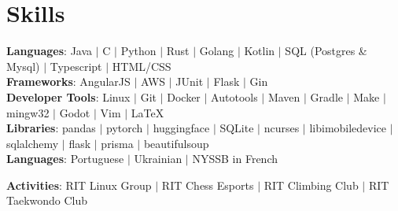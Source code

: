 \documentclass[letterpaper,11pt]{article}
\begin{document}
\section{Skills}
 \begin{itemize}[leftmargin=0.15in, label={}]
    \small{\item{
        \textbf{Languages}{: Java $|$ C $|$ Python $|$ Rust $|$ Golang $|$ Kotlin $|$ SQL (Postgres \& Mysql) $|$ Typescript $|$ HTML/CSS} \\ \vspace{0.5em} 
        \textbf{Frameworks}{: AngularJS $|$ AWS $|$ JUnit $|$ Flask $|$ Gin} \\ \vspace{0.5em} 
        \textbf{Developer Tools}{: Linux $|$ Git $|$ Docker $|$ Autotools $|$ Maven $|$ Gradle $|$ Make $|$ mingw32 $|$ Godot $|$ Vim $|$ \LaTeX} \\ \vspace{0.5em} 
        \textbf{Libraries}{: pandas $|$ pytorch $|$ huggingface $|$ SQLite $|$ ncurses $|$ libimobiledevice $|$ sqlalchemy $|$ flask $|$ prisma $|$ beautifulsoup} \\ \vspace{0.5em} 
        \textbf{Languages}{: Portuguese $|$ Ukrainian $|$ NYSSB in French} \\ \vspace{0.5em} 

        \textbf{Activities}{: RIT Linux Group $|$ RIT Chess Esports $|$ RIT Climbing Club $|$ RIT Taekwondo Club}}}
 \end{itemize}


\end{document}
